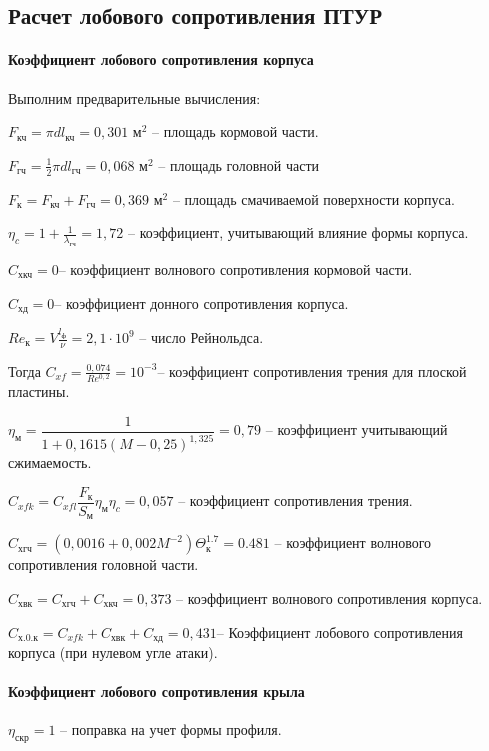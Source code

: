 \subsection{Расчет лобового сопротивления ПТУР}

\paragraph{Коэффициент лобового сопротивления корпуса}

Выполним предварительные вычисления:

$F_\text{кч}=\pi d l_\text{кч}=0,301 \text{ м}^2$ – площадь кормовой части.

$F_\text{гч}=\frac{1}{2} \pi d l_\text{гч}=0,068 \text{ м}^2$ – площадь головной части

$F_\text{к}=F_\text{кч}+F_\text{гч}=0,369 \text{ м}^2$ – площадь смачиваемой поверхности корпуса.

$\eta_c = 1 + \frac{1}{\lambda_\text{гч}} =1,72$ – коэффициент, учитывающий влияние формы корпуса.

$C_\text{хкч}=0 $– коэффициент волнового сопротивления кормовой части.

$C_\text{хд}=0 $– коэффициент донного сопротивления корпуса.

$Re_\text{к}=V \frac{l_\text{ф}}{\nu}=2,1 \cdot 10^9 $ – число Рейнольдса.

Тогда $C_{xf}=\frac{0,074}{Re^{0,2}} =10^{-3}$– коэффициент сопротивления трения для плоской пластины.

$\eta_\text{м} = \dfrac{1} {1+0,1615 (M-0,25)^{1,325}} =0,79$ – коэффициент учитывающий сжимаемость.

$C_{xfk} = C_{xfl} \dfrac{F_\text{к}} {S_\text{м}}  \eta_\text{м} \eta_c =0,057$ – коэффициент сопротивления трения.

$C_\text{хгч}=(0,0016+0,002M^{-2} )  \Theta_\text{к}^{1.7}=0.481$ – коэффициент волнового сопротивления головной части.

$C_\text{хвк}=C_\text{хгч}+C_\text{хкч}=0,373$ – коэффициент волнового сопротивления корпуса.

$C_\text{х.0.к}=C_{xfk}+C_\text{хвк}+C_\text{хд}=0,431 $– Коэффициент лобового сопротивления корпуса (при нулевом угле атаки).

\paragraph{Коэффициент лобового сопротивления крыла}

$\eta_\text{скр}=1$ – поправка на учет формы профиля.

